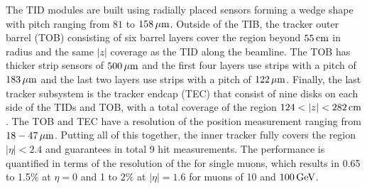 The TID modules are built using radially placed sensors forming a wedge shape with pitch ranging from $81$ to $158\,\mu\text{m}$. 
\newpara
\noindent\justify
Outside of the TIB, the tracker outer barrel (TOB) consisting of six barrel layers cover the region beyond $55\,\text{cm}$ in radius and the same $|z|$ coverage as the TID along the beamline.
The TOB has thicker strip sensors of $500\,\mu\text{m}$ and the first four layers use strips with a pitch of $183\,\mu\text{m}$ and the last two layers use strips with a pitch of $122\,\mu\text{m}$.   
Finally, the last tracker subsystem is the tracker endcap (TEC) that consist of nine disks on each side of the TIDs and TOB, with a total coverage of the region $124<|z|<282\cm$. 
The TOB and TEC have a resolution of the position measurement ranging from $18-47\,\mu\text{m}$. 
Putting all of this together, the inner tracker fully covers the region $|\eta|<2.4$ and guarantees in total 9 hit measurements. 
The performance is quantified in terms of the resolution of the \pt for single muons, which results in 0.65 to 1.5\% at $\eta=0$ and 1 to $2\%$ at $|\eta|=1.6$ for muons of 10 and $100\,\text{Ge\hspace{-.08em}V}$. 
